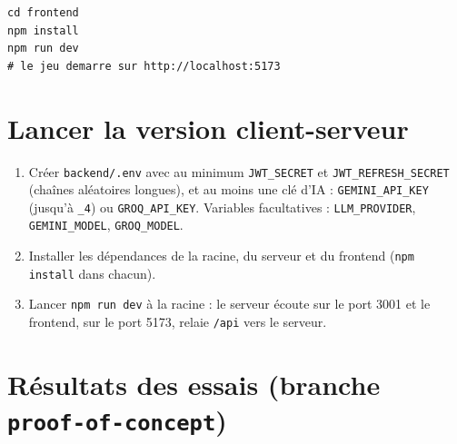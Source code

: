 \documentclass[11pt,a4paper]{report}
\newcommand{\file}[1]{\texttt{\nolinkurl{#1}}}
\begin{document}
\begin{lstlisting}[style=plain,caption={Lancement document\'e (README)}]
cd frontend
npm install
npm run dev
# le jeu demarre sur http://localhost:5173
\end{lstlisting}

\section{Lancer la version client-serveur}

\begin{enumerate}
  \item Cr\'eer \file{backend/.env} avec au minimum \texttt{JWT\_SECRET} et
        \texttt{JWT\_REFRESH\_SECRET} (cha\^ines al\'eatoires longues), et au moins une
        cl\'e d'IA : \texttt{GEMINI\_API\_KEY} (jusqu'\`a \texttt{\_4}) ou
        \texttt{GROQ\_API\_KEY}. Variables facultatives : \texttt{LLM\_PROVIDER},
        \texttt{GEMINI\_MODEL}, \texttt{GROQ\_MODEL}.
  \item Installer les d\'ependances de la racine, du serveur et du frontend
        (\texttt{npm install} dans chacun).
  \item Lancer \texttt{npm run dev} \`a la racine : le serveur \'ecoute sur le port 3001
        et le frontend, sur le port 5173, relaie \texttt{/api} vers le serveur.
\end{enumerate}

\section{R\'esultats des essais (branche \texttt{proof-of-concept})}
\end{document}
